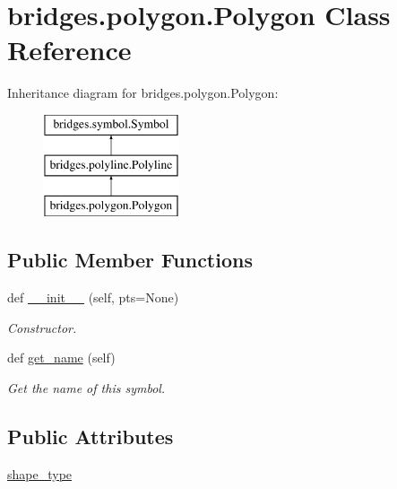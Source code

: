 \hypertarget{classbridges_1_1polygon_1_1_polygon}{}\section{bridges.\+polygon.\+Polygon Class Reference}
\label{classbridges_1_1polygon_1_1_polygon}
Inheritance diagram for bridges.\+polygon.\+Polygon\+:\begin{figure}[H]
\begin{center}
\leavevmode
\includegraphics[height=3.000000cm]{classbridges_1_1polygon_1_1_polygon}
\end{center}
\end{figure}
\subsection*{Public Member Functions}
\begin{DoxyCompactItemize}
\item 
def \hyperlink{classbridges_1_1polygon_1_1_polygon_a6e2515889df5d8626a32de2d4b36abc1}{\+\_\+\+\_\+init\+\_\+\+\_\+} (self, pts=None)
\begin{DoxyCompactList}\small\item\em Constructor. \end{DoxyCompactList}\item 
def \hyperlink{classbridges_1_1polygon_1_1_polygon_afa0d94f62a19b24ad3764bc900718346}{get\+\_\+name} (self)
\begin{DoxyCompactList}\small\item\em Get the name of this symbol. \end{DoxyCompactList}\end{DoxyCompactItemize}
\subsection*{Public Attributes}
\begin{DoxyCompactItemize}
\item 
\hyperlink{classbridges_1_1polygon_1_1_polygon_ae9c67cb9337ec5deebf1e334e84b3635}{shape\+\_\+type}
\end{DoxyCompactItemize}


